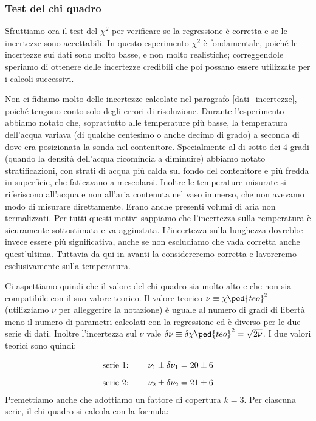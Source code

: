 \subsubsection{Test del chi quadro}
\label{chi_1}

Sfruttiamo ora il test del $\chi^2$ per verificare se la regressione è corretta e se le incertezze sono accettabili.
In questo esperimento $\chi^2$ è fondamentale, poiché le incertezze sui dati sono molto basse, e non molto realistiche;
correggendole speriamo di ottenere delle incertezze credibili che poi possano essere utilizzate per i calcoli successivi.

Non ci fidiamo molto delle incertezze calcolate nel paragrafo \ref{dati_incertezze}, poiché tengono conto solo degli errori
di risoluzione. Durante l'esperimento abbiamo notato che, soprattutto alle temperature più basse, la temperatura dell'acqua
variava (di qualche centesimo o anche decimo di grado) a seconda di dove era posizionata la sonda nel contenitore. Specialmente
al di sotto dei 4 gradi (quando la densità dell'acqua ricomincia a diminuire) abbiamo notato stratificazioni, con strati di acqua
più calda sul fondo del contenitore e più fredda in superficie, che faticavano a mescolarsi. Inoltre le temperature misurate
si riferiscono all'acqua e non all'aria contenuta nel vaso immerso, che non avevamo modo di misurare direttamente. Erano anche
presenti volumi di aria non termalizzati. Per tutti questi motivi sappiamo che l'incertezza sulla remperatura è sicuramente
sottostimata e va aggiustata. L'incertezza sulla lunghezza dovrebbe invece essere più significativa, anche se non escludiamo
che vada corretta anche quest'ultima. Tuttavia da qui in avanti la considereremo corretta e lavoreremo esclusivamente sulla temperatura.

Ci aspettiamo quindi che il valore del chi quadro sia molto alto e che non sia compatibile con il suo valore teorico. Il valore teorico
$\nu \equiv \chi\ped{teo}^2$ (utilizziamo $\nu$ per alleggerire la notazione) è uguale al numero di gradi di libertà meno
il numero di parametri calcolati con la regressione ed è diverso per le due serie di dati. Inoltre l'incertezza sul
$\nu$ vale $\delta \nu \equiv \delta \chi\ped{teo}^2 = \sqrt{2\nu}$. I due valori teorici sono quindi:

\begin{equation}
    \begin{array}{l @{\hspace{0.8cm}} c}
        \text{serie 1:} & \nu_1 \pm \delta \nu_1 = 20 \pm 6 \\[3mm]
        \text{serie 2:} & \nu_2 \pm \delta \nu_2 = 21 \pm 6
    \end{array}
\end{equation}
%
Premettiamo anche che adottiamo un fattore di copertura $k = 3$.
Per ciascuna serie, il chi quadro si calcola con la formula:

